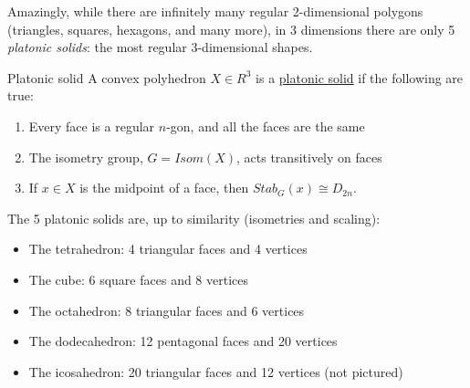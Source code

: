 \documentclass[../Main.tex]{subfiles}
\begin{document}
Amazingly, while there are infinitely many regular 2-dimensional polygons (triangles, squares, hexagons, and many more), in 3 dimensions there are only 5 \textit{platonic solids}: the most regular 3-dimensional shapes.
\begin{definition}{Platonic solid}
    A convex polyhedron $X \in R^3$ is a \underline{platonic solid} if the following are true:
    \begin{enumerate}
        \item Every face is a regular $n$-gon, and all the faces are the same
        \item The isometry group, $G = Isom(X)$, acts transitively on faces
        \item If $x \in X$ is the midpoint of a face, then $Stab_G(x) \cong D_{2n}$.
    \end{enumerate}
\end{definition}
The 5 platonic solids are, up to similarity (isometries and scaling): %
\begin{itemize}
    \item The tetrahedron: 4 triangular faces and 4 vertices
    \item The cube: 6 square faces and 8 vertices
    \item The octahedron: 8 triangular faces and 6 vertices
    \item The dodecahedron: 12 pentagonal faces and 20 vertices
    \item The icosahedron: 20 triangular faces and 12 vertices (not pictured)
\end{itemize}
\end{document}
